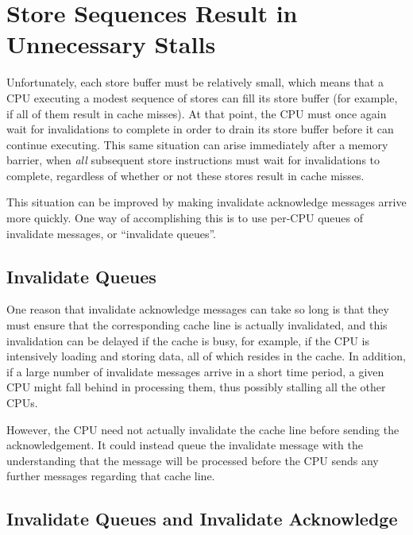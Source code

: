 \section{Store Sequences Result in Unnecessary Stalls}
\label{sec:app:whymb:Store Sequences Result in Unnecessary Stalls}

Unfortunately, each store buffer must be relatively small, which means
that a CPU executing a modest sequence of stores can fill its store
buffer (for example, if all of them result in cache misses).
At that point, the CPU must once again wait for invalidations to complete
in order to drain its store buffer before it can continue executing.
This same situation can arise immediately after a memory barrier, when
\emph{all} subsequent store instructions must wait for invalidations to
complete, regardless of whether or not these stores result in cache misses.

This situation can be improved by making invalidate acknowledge
messages arrive more quickly.
One way of accomplishing this is to use per-CPU queues of
invalidate messages, or ``invalidate queues''.

\subsection{Invalidate Queues}
\label{sec:app:whymb:Invalidate Queues}

One reason that invalidate acknowledge messages can take so long
is that they must ensure that the corresponding cache line is
actually invalidated, and this invalidation can be delayed if
the cache is busy, for example, if the CPU is intensively loading
and storing data, all of which resides in the cache.
In addition, if a large number of invalidate messages arrive
in a short time period, a given CPU might fall behind in processing
them, thus possibly stalling all the other CPUs.

However, the CPU need not actually invalidate the cache line
before sending the acknowledgement.
It could instead queue the invalidate message with the understanding
that the message will be processed before the CPU sends any further
messages regarding that cache line.

\subsection{Invalidate Queues and Invalidate Acknowledge}
\label{sec:app:whymb:Invalidate Queues and Invalidate Acknowledge}

